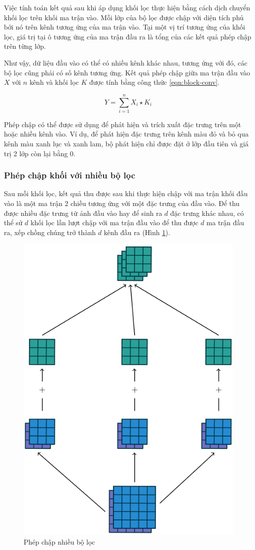 Việc tính toán kết quả sau khi áp dụng khối lọc thực hiện bằng cách dịch chuyển khối lọc trên khối ma trận vào. Mỗi lớp của bộ lọc được chập với diện tích phủ bởi nó trên kênh tương ứng của ma trận vào. Tại một vị trí tương ứng của khối lọc, giá trị tại ô tương ứng của ma trận đầu ra là tổng của các kết quả phép chập trên từng lớp.

Như vậy, dữ liệu đầu vào có thể có nhiều kênh khác nhau, tương ứng với đó, các bộ lọc cũng phải có số kênh tương ứng. Kết quả phép chập giữa ma trận đầu vào $X$ với $n$ kênh và khối lọc $K$ được tính bằng công thức \ref{eqn:block-conv}.

\begin{equation}\label{eqn:block-conv}
	Y = \sum^n_{i=1}X_i\star K_i
\end{equation}

Phép chập có thể được sử dụng để phát hiện và trích xuất đặc trưng trên một hoặc nhiều kênh vào. Ví dụ, để phát hiện đặc trưng trên kênh màu đỏ và bỏ qua kênh màu xanh lục và xanh lam, bộ phát hiện chỉ được đặt ở lớp đầu tiên và giá trị 2 lớp còn lại bằng 0.



\subsubsection{Phép chập khối với nhiều bộ lọc}

Sau mỗi khối lọc, kết quả thu được sau khi thực hiện chập với ma trận khối đầu vào là một ma trận 2 chiều tương ứng với một đặc trưng của đầu vào. Để thu được nhiều đặc trưng từ ảnh đầu vào hay để sinh ra $d$ đặc trưng khác nhau, có thể sử $d$ khối lọc lần lượt chập với ma trận đầu vào để thu được $d$ ma trận đầu ra, xếp chồng chúng trở thành $d$ kênh đầu ra (Hình \ref{fig:multiple-filter-block-conv}).

\begin{figure}[h]
	\centering
	\includegraphics[width=0.6\linewidth]{images/multiple-filter-block-conv}
	\caption{Phép chập nhiều bộ lọc \cite{wei2021}}
	\label{fig:multiple-filter-block-conv}
\end{figure}

